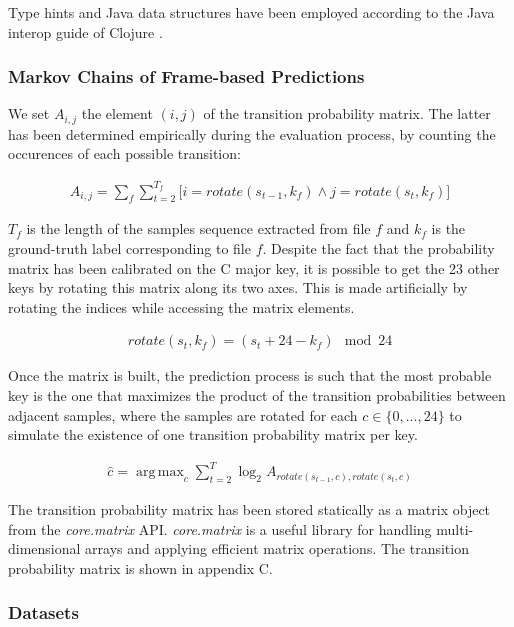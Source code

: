 \documentclass[letterpaper]{article}
\DeclareMathOperator*{\argmax}{arg\,max}
\begin{document}
\FloatBarrier

Type hints and Java data structures have been employed according to the Java interop guide of Clojure \citep{CL}.

\subsubsection{Markov Chains of Frame-based Predictions}
\label{sssec:A}

We set $A_{i, j}$ the element $(i, j)$ of the transition probability matrix. The latter has been determined empirically during the evaluation process, by counting the occurences of each possible transition:

\begin{align}
A_{i, j} = \sum_f \sum_{t=2}^{T_f} \big[ i=rotate(s_{t-1}, k_f) \wedge j=rotate(s_t, k_f) \big]
\label{MIJ}
\end{align}

$T_f$ is the length of the samples sequence extracted from file $f$ and $k_f$ is the ground-truth label corresponding to file $f$.
Despite the fact that the probability matrix has been calibrated on the C major key, it is possible to get the 23 other keys by rotating this matrix along its two axes.
This is made artificially by rotating the indices while accessing the matrix elements.

\begin{align}
rotate(s_t, k_f) = (s_t + 24 - k_f) \mod 24
\label{rotate}
\end{align}


Once the matrix is built, the prediction process is such that the most probable key is the one that maximizes the product of the transition probabilities between adjacent samples, 
where the samples are rotated for each $c \in \{0, ..., 24\}$ to simulate the existence of one transition probability matrix per key.

\begin{align}
\hat{c} = \argmax_c \sum_{t=2}^{T} \log_2 A_{rotate(s_{t-1}, c), rotate(s_{t}, c)}
\label{logprobaclojure}
\end{align}

The transition probability matrix has been stored statically as a matrix object from the \textit{core.matrix} API. \textit{core.matrix} is a useful library for handling multi-dimensional arrays and applying efficient matrix operations. The transition probability matrix is shown in appendix C.

\subsubsection{Datasets}
\end{document}
